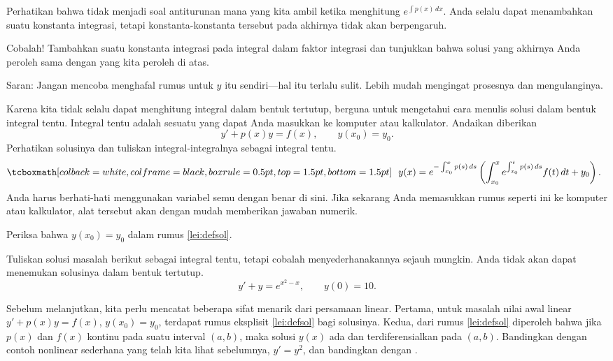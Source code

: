 Perhatikan bahwa tidak menjadi soal antiturunan mana yang kita ambil ketika menghitung
$e^{\int p(x) \, dx}$. Anda selalu dapat menambahkan suatu konstanta integrasi,
tetapi konstanta-konstanta tersebut
pada akhirnya tidak akan berpengaruh.

\begin{exercise}
Cobalah! Tambahkan suatu konstanta integrasi pada integral dalam
faktor integrasi dan tunjukkan bahwa solusi yang akhirnya Anda peroleh
sama dengan yang kita peroleh di atas.
\end{exercise}

Saran: Jangan mencoba menghafal rumus untuk $y$ itu sendiri---hal itu terlalu
sulit. Lebih mudah mengingat prosesnya dan mengulanginya.

Karena kita tidak selalu dapat menghitung integral dalam bentuk tertutup, berguna untuk
mengetahui cara menulis solusi dalam bentuk integral tentu. Integral tentu
adalah sesuatu yang
dapat Anda masukkan ke komputer atau kalkulator. Andaikan diberikan
\begin{equation*}
y' + p(x) y = f(x) , \qquad y(x_0) = y_0 .
\end{equation*}
Perhatikan solusinya dan tuliskan integral-integralnya
sebagai integral tentu.
\begin{equation} \label{lei:defsol}
\mybxbg{
~~
y(x) = e^{-\int_{x_0}^x p(s)\, ds} \left( \int_{x_0}^x e^{\int_{x_0}^t p(s)\, ds}
f(t) \,dt + y_0 \right).
~~
}
\end{equation}
Anda harus
berhati-hati menggunakan variabel semu dengan benar di sini. Jika sekarang Anda memasukkan rumus
seperti ini ke
komputer atau kalkulator, alat tersebut akan dengan mudah memberikan jawaban numerik.

\begin{exercise}
Periksa bahwa $y(x_0) = y_0$ dalam rumus \eqref{lei:defsol}.
\end{exercise}

\begin{exercise}
Tuliskan solusi masalah berikut
sebagai integral tentu, tetapi cobalah menyederhanakannya sejauh mungkin. Anda tidak akan
dapat menemukan solusinya dalam bentuk tertutup.
\begin{equation*}
y' + y = e^{x^2-x}, \qquad y(0) = 10 .
\end{equation*}
\end{exercise}

\begin{remark}
Sebelum melanjutkan, kita perlu mencatat beberapa sifat menarik dari persamaan
linear. Pertama, untuk masalah nilai awal linear
$y' + p(x) y = f(x)$, $y(x_0) = y_0$,
terdapat rumus eksplisit \eqref{lei:defsol} bagi
solusinya. Kedua, dari rumus \eqref{lei:defsol} diperoleh
bahwa jika $p(x)$
dan $f(x)$ kontinu pada suatu interval $(a,b)$, maka
solusi $y(x)$ ada dan terdiferensialkan pada $(a,b)$. Bandingkan
dengan contoh nonlinear sederhana yang telah kita lihat sebelumnya, $y'=y^2$,
dan bandingkan dengan .
\end{remark}


